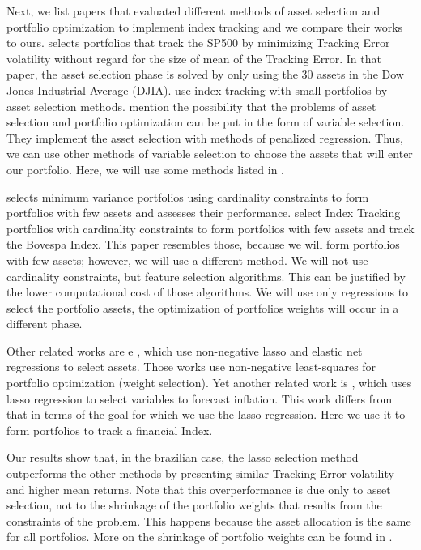 \documentclass[12pt,oneside,a4paper]{memoir}
\begin{document}
Next, we list papers that evaluated different methods of asset selection and portfolio optimization to implement index tracking and we compare their works to ours.
%
 selects portfolios that track the SP500 by minimizing Tracking Error volatility without regard for the size of mean of the Tracking Error.
In that paper, the asset selection phase is solved by only using the 30 assets in the Dow Jones Industrial Average (DJIA).
 use index tracking with small portfolios by asset selection methods.
 mention the possibility that the problems of asset selection and portfolio optimization can be put in the form of variable selection.
They implement the asset selection with methods of penalized regression.
Thus, we can use other methods of variable selection to choose the assets that will enter our portfolio.
Here, we will use some methods listed in .

 selects minimum variance portfolios using cardinality constraints to form portfolios with few assets and assesses their performance.
 select Index Tracking portfolios with cardinality constraints to form portfolios with few assets and track the Bovespa Index.
This paper resembles those, because we will form portfolios with few assets; however, we will use a different method.
We will not use cardinality constraints, but feature selection algorithms.
This can be justified by the lower computational cost of those algorithms.
We will use only regressions to select the portfolio assets, the optimization of portfolios weights will occur in a different phase.

Other related works are  e , which use non-negative lasso and elastic net regressions to select assets.
Those works use non-negative least-squares for portfolio optimization (weight selection).
Yet another related work is , which uses lasso regression to select variables to forecast inflation.
This work differs from that in terms of the goal for which we use the lasso regression.
Here we use it to form portfolios to track a financial Index.


Our results show that, in the brazilian case, the lasso selection method outperforms the other methods by presenting similar Tracking Error volatility and higher mean returns.
Note that this overperformance is due only to asset selection, not to the shrinkage of the portfolio weights that results from the constraints of the problem.
This happens because the asset allocation is the same for all portfolios.
More on the shrinkage of portfolio weights can be found in .
\end{document}
